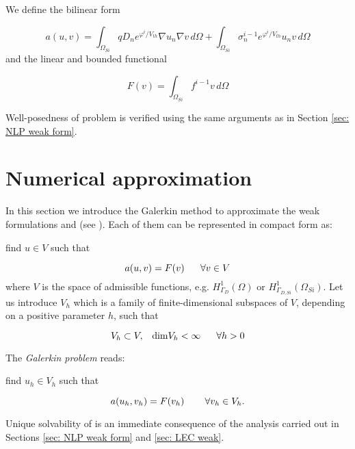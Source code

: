 We define the bilinear form

\begin{equation}
\label{eq: bilinear form LEC}
a(u,v) =  \int_{\Omega_{Si}}  q D_n e^{\varphi^{i}/V_{th}} \nabla u_n \nabla v \, d\Omega + \int_{\Omega_{Si}} \sigma_n^{i-1} e^{\varphi^{i}/V_{th}} u_n v \, d\Omega
\end{equation}
and the linear and bounded functional

\begin{equation}
\label{eq: functional LEC}
F(v) = \int_{\Omega_{Si}} f^{i-1}v \, d\Omega
\end{equation}

Well-posedness of problem  is verified using the same arguments as in Section \ref{sec: NLP weak form}.



\section{Numerical approximation}
\label{sec: Numerical approximation}


In this section we introduce the Galerkin method to approximate the weak formulations  and  (see \cite{quarteroni:NumApprox}). Each of them can be represented in compact form as:

find $u \in V$ such that

\begin{equation}
a(u,v) = F(v) \psp{10} \forall v \in V
\end{equation}
where $V$ is the space of admissible functions, e.g. $H^1_{\Gamma_D}(\Omega)$ or $H^1_{\Gamma_{D,Si}}(\Omega_{Si})$.
Let us introduce $V_h$ which is a family of finite-dimensional subspaces of $V$, depending on a positive parameter $h$, such that

\begin{equation}
V_h \subset V, \psp{5} {\rm dim} V_h < \infty \psp{10} \forall h>0
\end{equation}

The \textit{Galerkin problem} reads:

find $u_h\in V_h$ such that

\begin{equation}
\label{eq: general galerkin problem}
 a(u_h,v_h) = F(v_h) \psp{3} \psp{10} \forall v_h \in V_h.
\end{equation}

Unique solvability of  is an immediate consequence of the analysis carried out in Sections \ref{sec: NLP weak form} and \ref{sec: LEC weak}.

